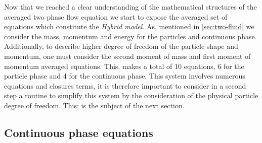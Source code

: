 
Now that we reached a clear understanding of the mathematical structures of the averaged two phase flow equation we start to expose the averaged set of equations which constitute the \textit{Hybrid model}. 
As, mentioned in \ref{sec:two-fluid} we consider the mass, momentum and energy for the particles and continuous phase. 
Additionally, to describe higher degree of freedom of the particle shape and momentum, one must consider the second moment of mass and first moment of momentum averaged equations. 
This, makes a total of 10 equations, 6 for the particle phase and 4 for the continuous phase.
This system involves numerous equations and closures terms, it is therefore important to consider in a second step a routine to simplify this system by the consideration of the physical particle degree of freedom.
This; is the subject of the next section.    

\subsection{Continuous phase equations}

